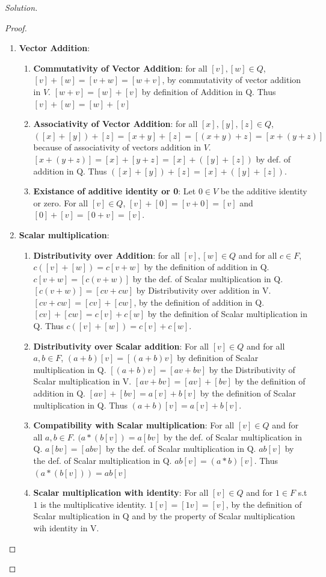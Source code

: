 \documentclass{article}
\newenvironment{solution}
{\renewcommand\qedsymbol{$\blacksquare$}\begin{proof}[Solution]}
		{\end{proof}}
\begin{document}
\begin{solution}
\begin{proof}
		\begin{enumerate}{}
			\item \textbf{Vector Addition}:
			      \begin{enumerate}{}
				      \item \textbf{Commutativity of Vector Addition}: for all $[v], [w] \in Q$, $[v] + [w] = [v+w]=[w + v]$, by commutativity of vector addition in $V$. $[w + v] = [w] + [v]$ by definition of Addition in Q. Thus $[v] + [w] = [w] + [v]$
				      \item \textbf{Associativity of Vector Addition}: for all $[x], [y], [z] \in Q$, $([x] + [y]) + [z] = [x + y] + [z] = [(x + y) + z] = [x + (y + z)]$ because of associativity of vectors addition in $V$. $[x + (y + z)] = [x] + [y + z] = [x] + ([y] + [z])$ by def. of addition in Q. Thus $([x] + [y]) + [z] = [x] + ([y] + [z])$.
				      \item \textbf{Existance of additive identity or 0}: Let $0 \in V$ be the additive identity or zero. For all $[v] \in Q$, $[v] + [0] = [v + 0] = [v]$ and $[0] + [v] = [0 + v] = [v]$.
			      \end{enumerate}
			\item \textbf{Scalar multiplication}:
			      \begin{enumerate}{}
				      \item \textbf{Distributivity over Addition}: for all $[v], [w] \in Q$ and for all $c \in F$, $c([v] + [w]) = c[v+w]$ by the definition of addition in Q. $c[v+w] = [c(v+w)]$ by the def. of Scalar multiplication in Q. $[c(v+w)] = [cv + cw]$ by Distributivity over addition in V. $[cv+cw] = [cv] + [cw]$, by the definition of addition in Q. $[cv] + [cw] = c[v] + c[w]$ by the definition of Scalar multiplication in Q. Thus $c([v] + [w]) = c[v] + c[w]$.
				      \item \textbf{Distributivity over Scalar addition}: For all $[v] \in Q$ and for all $a, b \in F$, $(a + b)[v] = [(a+b)v]$ by definition of Scalar multiplication in Q. $[(a+b)v] = [av + bv]$ by the Distributivity of Scalar multiplication in V. $[av + bv] = [av] + [bv]$ by the definition of addition in Q. $[av] + [bv] = a[v] + b[v]$ by the definition of Scalar multiplication in Q. Thus $(a+b)[v] = a[v] + b[v]$.
				      \item \textbf{Compatibility with Scalar multiplication}: For all $[v] \in Q$ and for all $a, b \in F$. $(a * (b[v]) = a[bv]$ by the def. of Scalar multiplication in Q. $a[bv] = [abv]$ by the def. of Scalar multiplication in Q. $ab[v]$ by the def. of Scalar multiplication in Q. $ab[v] = (a*b)[v]$. Thus $(a*(b[v])) = ab[v]$
				      \item \textbf{Scalar multiplication with identity}: For all $[v] \in Q$ and for $1 \in F$ s.t $1$ is the multiplicative identity. $1[v]= [1v] = [v]$, by the definition of Scalar multiplication in Q and by the property of Scalar multiplication wih identity in V.
			      \end{enumerate}
		\end{enumerate}


\end{proof}
\end{solution}
\end{document}
